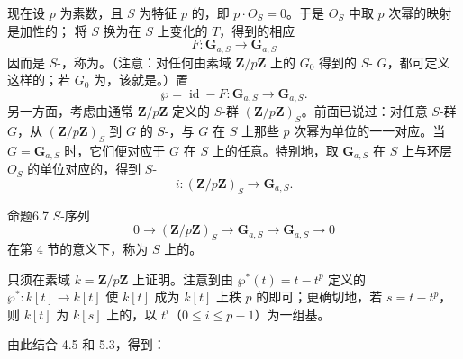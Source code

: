 现在设 $p$ 为素数，且 $S$ 为特征 $p$ 的，即 $p\cdot O_S=0$。于是 $O_S$ 中取 $p$ 次幂的映射是加性的；
将 $S$ 换为在 $S$ 上变化的 $T$，得到的相应
\[
F:\mathbf G_{a,S}\longrightarrow\mathbf G_{a,S}
\]
因而是 $S$-，称为。（注意：对任何由素域 $\mathbf Z/p\mathbf Z$ 上的 $G_0$ 得到的 $S$- $G$，都可定义这样的；若 $G_0$ 为，该就是。）置
\[
\wp=\operatorname{id}-F:\mathbf G_{a,S}\longrightarrow\mathbf G_{a,S}.
\]
另一方面，考虑由通常 $\mathbf Z/p\mathbf Z$ 定义的 $S$-群 $(\mathbf Z/p\mathbf Z)_S$。前面已说过：对任意 $S$-群 $G$，从 $(\mathbf Z/p\mathbf Z)_S$ 到 $G$ 的 $S$-，与 $G$ 在 $S$ 上那些 $p$ 次幂为单位的一一对应。当 $G=\mathbf G_{a,S}$ 时，它们便对应于 $G$ 在 $S$ 上的任意。特别地，取 $\mathbf G_{a,S}$ 在 $S$ 上与环层 $O_S$ 的单位对应的，得到 $S$-
\[
i:(\mathbf Z/p\mathbf Z)_S\longrightarrow\mathbf G_{a,S}.
\]

\begin{SGAresult}{命题}{6.7}
$S$-序列
\[
0\longrightarrow(\mathbf Z/p\mathbf Z)_S
\longrightarrow\mathbf G_{a,S}\longrightarrow\mathbf G_{a,S}\longrightarrow0
\]
在第 4 节的意义下，称为 $S$ 上的。
\end{SGAresult}
只须在素域 $k=\mathbf Z/p\mathbf Z$ 上证明。注意到由 $\wp^*(t)=t-t^p$ 定义的 $\wp^*:k[t]\to k[t]$ 使 $k[t]$ 成为 $k[t]$ 上秩 $p$ 的即可；更确切地，若 $s=t-t^p$，则 $k[t]$ 为 $k[s]$ 上的，以 $t^i$（$0\leq i\leq p-1$）为一组基。

由此结合 4.5 和 5.3，得到：

